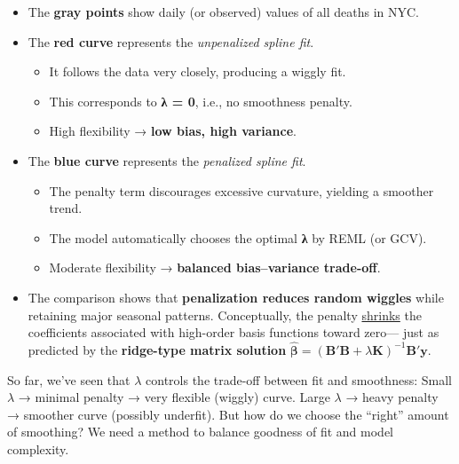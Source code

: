 \documentclass[
  letterpaper,
  DIV=11,
  numbers=noendperiod]{scrreprt}
\providecommand{\tightlist}{%
  \setlength{\itemsep}{0pt}\setlength{\parskip}{0pt}}\usepackage{longtable,booktabs,array}
\begin{document}
\begin{itemize}
\tightlist
\item
  The \textbf{gray points} show daily (or observed) values of all deaths
  in NYC.\\
\item
  The \textbf{red curve} represents the \emph{unpenalized spline fit}.

  \begin{itemize}
  \tightlist
  \item
    It follows the data very closely, producing a wiggly fit.
  \item
    This corresponds to \textbf{λ = 0}, i.e., no smoothness penalty.
  \item
    High flexibility → \textbf{low bias, high variance}.\\
  \end{itemize}
\item
  The \textbf{blue curve} represents the \emph{penalized spline fit}.

  \begin{itemize}
  \tightlist
  \item
    The penalty term discourages excessive curvature, yielding a
    smoother trend.
  \item
    The model automatically chooses the optimal \textbf{λ} by REML (or
    GCV).
  \item
    Moderate flexibility → \textbf{balanced bias--variance trade-off}.\\
  \end{itemize}
\item
  The comparison shows that \textbf{penalization reduces random wiggles}
  while retaining major seasonal patterns. Conceptually, the penalty
  \ul{shrinks} the coefficients associated with high-order basis
  functions toward zero--- just as predicted by the \textbf{ridge-type
  matrix solution}
  \(\hat{\boldsymbol{\beta}} = (\mathbf{B}'\mathbf{B} + \lambda\mathbf{K})^{-1}\mathbf{B}'\mathbf{y}\).
\end{itemize}

\begin{tcolorbox}[enhanced jigsaw, rightrule=.15mm, breakable, left=2mm, colframe=quarto-callout-note-color-frame, opacityback=0, leftrule=.75mm, toprule=.15mm, colback=white, arc=.35mm, bottomrule=.15mm]

So far, we've seen that \(\lambda\) controls the trade-off between fit
and smoothness: Small \(\lambda\) → minimal penalty → very flexible
(wiggly) curve. Large \(\lambda\) → heavy penalty → smoother curve
(possibly underfit). But how do we choose the ``right'' amount of
smoothing? We need a method to balance goodness of fit and model
complexity.

\end{tcolorbox}
\end{document}
